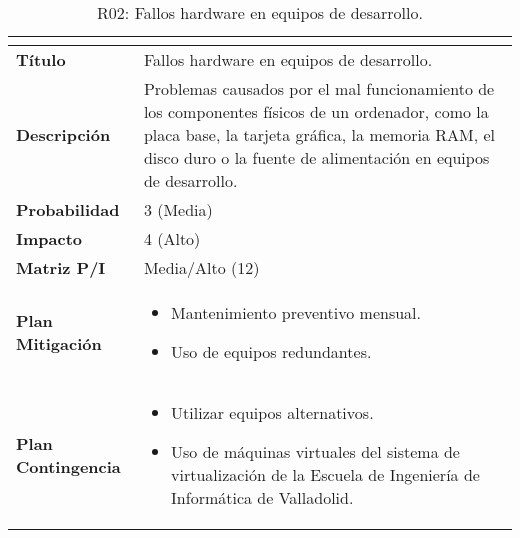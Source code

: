 \begin{table}[H]
\centering
\begin{tabular}{|>{\bfseries}l|p{10cm}|}
\hline
\rowcolor{lightgray}
\multicolumn{2}{|c|}{\textbf{Riesgo R02}} \\ \hline
Título & Fallos hardware en equipos de desarrollo. \\ \hline
Descripción & Problemas causados por el mal funcionamiento de los componentes físicos de un ordenador, como la placa base, la tarjeta gráfica, la memoria RAM, el disco duro o la fuente de alimentación en equipos de desarrollo. \\ \hline
Probabilidad & 3 (Media)   \cellcolor{yellowrisk}\\ \hline
Impacto & 4 (Alto)   \cellcolor{orangerisk}\\ \hline
Matriz P/I & Media/Alto (12)\\ \hline
Plan Mitigación & 
\begin{itemize}
\item Mantenimiento preventivo mensual.
\item Uso de equipos redundantes.
\end{itemize} \\ \hline
Plan Contingencia & 
\begin{itemize}
\item Utilizar equipos alternativos.
\item Uso de máquinas virtuales del sistema de virtualización de la Escuela de Ingeniería de Informática de Valladolid.
\end{itemize} \\ \hline
\end{tabular}
\caption{R02: Fallos hardware en equipos de desarrollo.}
\label{tab:R02}
\end{table}

